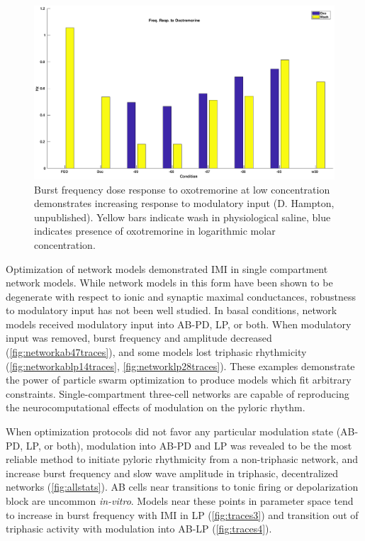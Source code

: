 \begin{figure}
	\centering
	\includegraphics[width=1.0\linewidth]{gfx/Oxo_Dose_Resp_curve}
	\caption[Burst frequency dose response to oxotremorine]{Burst frequency dose response to oxotremorine at low concentration demonstrates increasing response to modulatory input (D. Hampton, unpublished). Yellow bars indicate wash in physiological saline, blue indicates presence of oxotremorine in logarithmic molar concentration.}
	\label{fig:oxodoserespcurve}
\end{figure}


Optimization of network models demonstrated \acs{IMI} in single compartment network models. While network models in this form have been shown to be degenerate with respect to ionic and synaptic maximal conductances\autocite{PrinzAlternativehandtuningconductancebased2003,PrinzSimilarnetworkactivity2004,PrinzComputationalapproachesneuronal2010}, robustness to modulatory input has not been well studied. In basal conditions, network models received modulatory input into \acs{AB}-\acs{PD}, \acs{LP}, or both. When modulatory input was removed, burst frequency and amplitude decreased (\autoref{fig:networkab47traces}), and some models lost triphasic rhythmicity (\autoref{fig:networkablp14traces}, \autoref{fig:networklp28traces}). These examples demonstrate the power of particle swarm optimization to produce models which fit arbitrary constraints. Single-compartment three-cell networks are capable of reproducing the neurocomputational effects of modulation on the pyloric rhythm.

When optimization protocols did not favor any particular modulation state (\acs{AB}-\acs{PD}, \acs{LP}, or both), modulation into \acs{AB}-\acs{PD} and \acs{LP} was revealed to be the most reliable method to initiate pyloric rhythmicity from a non-triphasic network, and increase burst frequency and slow wave amplitude in triphasic, decentralized networks (\autoref{fig:allstats}). \acs{AB} cells near transitions to tonic firing or depolarization block are uncommon \textit{in-vitro}. Models near these points in parameter space tend to increase in burst frequency with \acs{IMI} in \acs{LP} (\autoref{fig:traces3}) and transition out of triphasic activity with modulation into \acs{AB}-\acs{LP} (\autoref{fig:traces4}).

